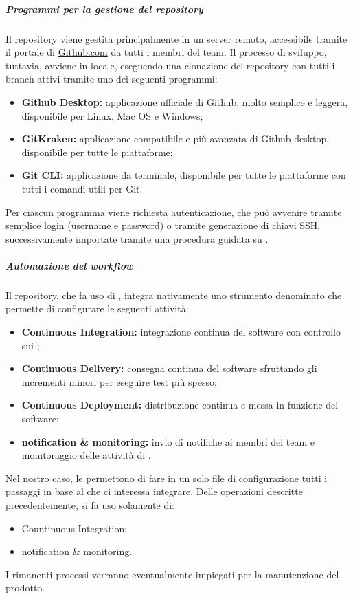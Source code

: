		\subparagraph{Programmi per la gestione del repository}

		Il repository viene gestita principalmente in un server remoto, accessibile tramite il portale di \href{https://github.com}{Github.com} da tutti i membri del team.
		\newline
		Il processo di sviluppo, tuttavia, avviene in locale, eseguendo una clonazione del repository con tutti i branch attivi tramite uno dei seguenti programmi:
		\begin{itemize}
			\item \textbf{Github Desktop:} applicazione ufficiale di Github, molto semplice e leggera, disponibile per Linux, Mac OS e Windows;
			\item \textbf{GitKraken:} applicazione compatibile e più avanzata di Github desktop, disponibile per tutte le piattaforme;
			\item \textbf{Git CLI:} applicazione da terminale, disponibile per tutte le piattaforme con tutti i comandi utili per Git.
		\end{itemize}
		Per ciascun programma viene richiesta autenticazione, che può avvenire tramite semplice login (username e password) o tramite generazione di chiavi SSH, successivamente importate tramite una procedura guidata su .

		\subparagraph{Automazione del workflow}

		Il repository, che fa uso di , integra nativamente uno strumento denominato  che permette di configurare le seguenti attività:
		\begin{itemize}
			\item \textbf{Continuous Integration:} integrazione continua del software con controllo sui ;
			\item \textbf{Continuous Delivery:} consegna continua del software sfruttando gli incrementi minori per eseguire test più spesso;
			\item \textbf{Continuous Deployment:} distribuzione continua e messa in funzione del software;
			\item \textbf{notification \& monitoring:} invio di notifiche ai membri del team e monitoraggio delle attività di .
		\end{itemize}
		Nel nostro caso, le  permettono di fare in un solo file di configurazione tutti i passaggi in base al  che ci interessa integrare. 
		\newline
		Delle operazioni descritte precedentemente, si fa uso solamente di:
		\begin{itemize}
			\item Countinuous Integration;
			\item notification \& monitoring.
		\end{itemize}
		I rimanenti processi verranno eventualmente impiegati per la manutenzione del prodotto.



